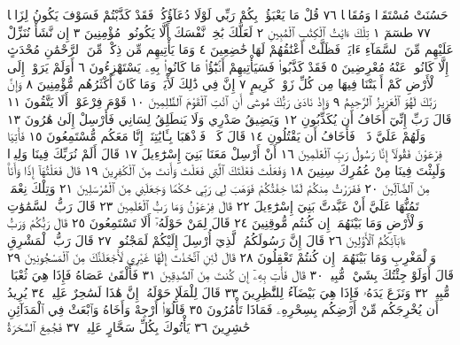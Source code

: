 حَسُنَتْ مُسْتَقَرࣰّا وَمُقَامࣰا ٧٦ قُلْ مَا يَعْبَؤُا۟ بِكُمْ رَبِّي
لَوْلَا دُعَآؤُكُمْۖ فَقَدْ كَذَّبْتُمْ فَسَوْفَ يَكُونُ لِزَامَۢا ٧٧
طسٓمٓ ١ تِلْكَ ءَايَٰتُ ٱلْكِتَٰبِ ٱلْمُبِينِ ٢ لَعَلَّكَ بَٰخِعࣱ نَّفْسَكَ أَلَّا
يَكُونُوا۟ مُؤْمِنِينَ ٣ إِن نَّشَأْ نُنَزِّلْ عَلَيْهِم مِّنَ ٱلسَّمَآءِ ءَايَةࣰ فَظَلَّتْ
أَعْنَٰقُهُمْ لَهَا خَٰضِعِينَ ٤ وَمَا يَأْتِيهِم مِّن ذِكْرࣲ مِّنَ ٱلرَّحْمَٰنِ مُحْدَثٍ
إِلَّا كَانُوا۟ عَنْهُ مُعْرِضِينَ ٥ فَقَدْ كَذَّبُوا۟ فَسَيَأْتِيهِمْ أَنۢبَٰٓؤُا۟ مَا كَانُوا۟ بِهِۦ
يَسْتَهْزِءُونَ ٦ أَوَلَمْ يَرَوْا۟ إِلَى ٱلْأَرْضِ كَمْ أَنۢبَتْنَا فِيهَا مِن كُلِّ زَوْجࣲ كَرِيمٍ ٧
إِنَّ فِي ذَٰلِكَ لَأٓيَةࣰۖ وَمَا كَانَ أَكْثَرُهُم مُّؤْمِنِينَ ٨ وَإِنَّ رَبَّكَ لَهُوَ ٱلْعَزِيزُ
ٱلرَّحِيمُ ٩ وَإِذْ نَادَىٰ رَبُّكَ مُوسَىٰٓ أَنِ ٱئْتِ ٱلْقَوْمَ ٱلظَّٰلِمِينَ ١٠ قَوْمَ فِرْعَوْنَۚ
أَلَا يَتَّقُونَ ١١ قَالَ رَبِّ إِنِّيٓ أَخَافُ أَن يُكَذِّبُونِ ١٢ وَيَضِيقُ صَدْرِي
وَلَا يَنطَلِقُ لِسَانِي فَأَرْسِلْ إِلَىٰ هَٰرُونَ ١٣ وَلَهُمْ عَلَيَّ ذَنۢبࣱ فَأَخَافُ
أَن يَقْتُلُونِ ١٤ قَالَ كَلَّاۖ فَٱذْهَبَا بِـَٔايَٰتِنَآۖ إِنَّا مَعَكُم مُّسْتَمِعُونَ ١٥
فَأْتِيَا فِرْعَوْنَ فَقُولَآ إِنَّا رَسُولُ رَبِّ ٱلْعَٰلَمِينَ ١٦ أَنْ أَرْسِلْ مَعَنَا
بَنِيٓ إِسْرَٰٓءِيلَ ١٧ قَالَ أَلَمْ نُرَبِّكَ فِينَا وَلِيدࣰا وَلَبِثْتَ فِينَا مِنْ عُمُرِكَ
سِنِينَ ١٨ وَفَعَلْتَ فَعْلَتَكَ ٱلَّتِي فَعَلْتَ وَأَنتَ مِنَ ٱلْكَٰفِرِينَ ١٩
قَالَ فَعَلْتُهَآ إِذࣰا وَأَنَا۠ مِنَ ٱلضَّآلِّينَ ٢٠ فَفَرَرْتُ مِنكُمْ لَمَّا خِفْتُكُمْ
فَوَهَبَ لِي رَبِّي حُكْمࣰا وَجَعَلَنِي مِنَ ٱلْمُرْسَلِينَ ٢١ وَتِلْكَ نِعْمَةࣱ تَمُنُّهَا
عَلَيَّ أَنْ عَبَّدتَّ بَنِيٓ إِسْرَٰٓءِيلَ ٢٢ قَالَ فِرْعَوْنُ وَمَا رَبُّ ٱلْعَٰلَمِينَ ٢٣
قَالَ رَبُّ ٱلسَّمَٰوَٰتِ وَٱلْأَرْضِ وَمَا بَيْنَهُمَآۖ إِن كُنتُم مُّوقِنِينَ ٢٤
قَالَ لِمَنْ حَوْلَهُۥٓ أَلَا تَسْتَمِعُونَ ٢٥ قَالَ رَبُّكُمْ وَرَبُّ ءَابَآئِكُمُ
ٱلْأَوَّلِينَ ٢٦ قَالَ إِنَّ رَسُولَكُمُ ٱلَّذِيٓ أُرْسِلَ إِلَيْكُمْ لَمَجْنُونࣱ ٢٧
قَالَ رَبُّ ٱلْمَشْرِقِ وَٱلْمَغْرِبِ وَمَا بَيْنَهُمَآۖ إِن كُنتُمْ تَعْقِلُونَ ٢٨
قَالَ لَئِنِ ٱتَّخَذْتَ إِلَٰهًا غَيْرِي لَأَجْعَلَنَّكَ مِنَ ٱلْمَسْجُونِينَ ٢٩
قَالَ أَوَلَوْ جِئْتُكَ بِشَيْءࣲ مُّبِينࣲ ٣٠ قَالَ فَأْتِ بِهِۦٓ إِن كُنتَ
مِنَ ٱلصَّٰدِقِينَ ٣١ فَأَلْقَىٰ عَصَاهُ فَإِذَا هِيَ ثُعْبَانࣱ مُّبِينࣱ ٣٢
وَنَزَعَ يَدَهُۥ فَإِذَا هِيَ بَيْضَآءُ لِلنَّٰظِرِينَ ٣٣ قَالَ لِلْمَلَإِ حَوْلَهُۥٓ
إِنَّ هَٰذَا لَسَٰحِرٌ عَلِيمࣱ ٣٤ يُرِيدُ أَن يُخْرِجَكُم مِّنْ أَرْضِكُم
بِسِحْرِهِۦ فَمَاذَا تَأْمُرُونَ ٣٥ قَالُوٓا۟ أَرْجِهْ وَأَخَاهُ وَٱبْعَثْ فِي ٱلْمَدَآئِنِ
حَٰشِرِينَ ٣٦ يَأْتُوكَ بِكُلِّ سَحَّارٍ عَلِيمࣲ ٣٧ فَجُمِعَ ٱلسَّحَرَةُ
